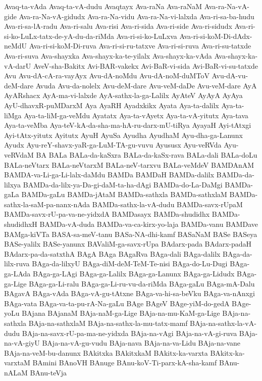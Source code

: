 {Avaq-ta-vAda
Avaq-ta-vA-dudu
Avaqtayx
Ava-raNa
Ava-raNaM
Ava-ra-Na-vA-gide
Ava-ra-Na-vA-gidudx
Ava-ra-Na-vidu
Ava-ra-Na-vi-lalxda
Ava-ri-sa-ba-hudu
Ava-ri-sa-lA-radu
Ava-ri-salu
Ava-risi
Ava-ri-sida
Ava-ri-side
Ava-ri-sidudx
Ava-ri-si-ko-LuLx-tatx-de-yA-du-da-riMda
Ava-ri-si-ko-LuLxva
Ava-ri-si-koM-Di-dAdx-neMdU
Ava-ri-si-koM-Di-ruva
Ava-ri-si-ru-tatxve
Ava-ri-si-ruva
Ava-ri-su-tatxde
Ava-ri-suva
Ava-shayxka
Ava-shayx-ka-te-yilalx
Ava-shayx-ka-vAda
Ava-shayx-ka-vA-darU
AveV-sha-Bakitx
Avi-BAR-vakekx
Avi-BaR-vi-sida
Avi-BaR-vi-su-tatxde
Avu
Avu-dA-cA-ra-vayAyx
Avu-dA-noMdu
Avu-dA-noM-duMToV
Avu-dA-vu-deM-dare
Avuda
Avu-da-nolelx
Avu-deM-dare
Avu-veM-daDe
Avu-veM-dare
AyA
AyARshacx
AyA-ma-vi-lalxde
AyA-sathx-la-ga-Lalilx
AyAteV
AyAyA
AyAya
AyU-dhavxR-puMDarxM
Aya
AyaRH
Ayadxkikx
Ayata
Aya-ta-dalilx
Aya-ta-liMga
Aya-ta-liM-ga-veMdu
Ayatatx
Aya-ta-vAyetx
Aya-ta-vA-yitutx
Aya-tava
Aya-ta-veMba
Aya-teV-kA-da-sha-ma-hA-ru-darx-mU-tiRya
AyayaH
Ayi-tAtxgi
Ayi-tAtx-yitutx
Ayitutx
AyuH
AyuSa
Ayudha
AyudhaM
Ayu-dha-ga-Lanunx
Ayudx
Ayu-reY-shavx-yaR-ga-LuM-TA-gu-vuvu
Ayususx
Ayu-veRVda
Ayu-veRVdaM
BA
BALa
BALa-da-kaSxra
BALa-da-kaSx-rava
BALa-dali
BALa-doLu
BALa-neVtarx
BALa-neVtarxM
BALa-neV-tarxvu
BALa-veMdeV
BAMDAnAM
BAMDA-va-Li-ga-Li-lalx-daMdu
BAMDa
BAMDaH
BAMDa-dalilx
BAMDa-da-lilxya
BAMDa-da-lilx-ya-Da-gi-daM-ta-ha-dAgi
BAMDa-do-La-DaMgi
BAMDa-gaLa
BAMDa-gaLu
BAMDa-jAtaM
BAMDa-sathxla
BAMDa-sathxlaM
BAMDa-sathx-la-saM-pa-nanx-nAda
BAMDa-sathx-la-vA-dudu
BAMDa-savx-rUpaM
BAMDa-savx-rU-pa-va-ne-yidxdA
BAMDasayx
BAMDa-shudidhx
BAMDa-shudidhxH
BAMDa-vA-duda
BAMDa-va-ca-kirx-yo-laja
BAMDa-vanu
BAMDave
BAMga-kiVTa
BASA-sa-meV-tanu
BASa-NA-dhi-kamf
BASaNaM
BASe
BASeya
BASe-yalilx
BASe-yanunx
BAValiM-ga-savx-rUpa
BAdarx-pada
BAdarx-padaH
BAdarx-pa-da-satxthA
BAgA
BAga
BAgaRva
BAga-dali
BAga-dalilx
BAga-da-lilx-ruva
BAga-da-lilxyU
BAga-diM-deM-TeM-Te-nisi
BAga-do-Lu-Dugi
BAga-ga-LAda
BAga-ga-LAgi
BAga-ga-Lalilx
BAga-ga-Lanunx
BAga-ga-Lidudx
BAga-ga-Lige
BAga-ga-Li-ralu
BAga-ga-Li-ru-vu-da-riMda
BAga-gaLu
BAga-mA-Dalu
BAgavA
BAga-vAda
BAga-vA-gu-tAtxne
BAga-va-hi-sa-beVku
BAga-va-nAnxgi
BAga-vata
BAga-va-ta-pu-rA-Na-gaLu
BAge
BAgeV
BAge-yiM-do-gedA
BAge-yoLu
BAjana
BAjanaM
BAja-naM-ga-Lige
BAja-na-mu-KaM-ga-Lige
BAja-na-sathxla
BAja-na-sathxlaM
BAja-na-sathx-la-mu-tatx-mamf
BAja-na-sathx-la-vA-dudu
BAja-na-savx-rU-pa-ma-ne-yidxda
BAja-na-vAgi
BAja-na-vA-gi-ruva
BAja-na-vA-giyU
BAja-na-vA-gu-vudu
BAja-nava
BAja-na-va-Lidu
BAja-na-vane
BAja-na-veM-bu-danunx
BAkitxka
BAkitxkaM
BAkitx-ka-varxta
BAkitx-ka-varxtaM
BAmini
BAnoVH
BAnuge
BAnu-koV-Ti-parx-kA-sha-kamf
BAnu-nALaM
BAnu-teVja
}
